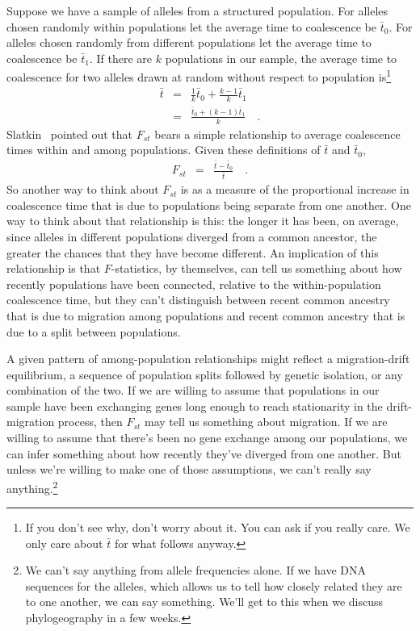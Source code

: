 Suppose we have a sample of alleles from a structured population. For
alleles chosen randomly within populations let the average time to
coalescence be $\bar t_0$. For alleles chosen randomly from different
populations let the average time to coalescence be $\bar t_1$. If
there are $k$ populations in our sample, the average time to
coalescence for two alleles drawn at random without respect to
population is\footnote{If you don't see why, don't worry about it. You
can ask if you really care. We only care about $\bar t$ for what
follows anyway.}
\begin{eqnarray*}
  \bar t &=& \frac{1}{k}\bar t_0 + \frac{k-1}{k}\bar t_1 \\
  &=& \frac{\bar t_0 + (k-1)\bar t_1}
              {k} \quad .
\end{eqnarray*}
Slatkin~\cite{Slatkin-1991} pointed out that $F_{st}$ bears a simple
relationship to average coalescence times within and among
populations. Given these definitions of $\bar t$ and $\bar t_0$,
\begin{eqnarray*}
  F_{st} &=& \frac{\bar t - \bar t_0}{\bar t} \quad .
\end{eqnarray*}
So another way to think about $F_{st}$ is as a measure of the
proportional increase in coalescence time that is due to populations
being separate from one another. One way to think about that
relationship is this: the longer it has been, on average, since
alleles in different populations diverged from a common ancestor, the
greater the chances that they have become different. An implication of
this relationship is that $F$-statistics, by themselves, can tell us
something about how recently populations have been connected, relative
to the within-population coalescence time, but they can't distinguish
between recent common ancestry that is due to migration among
populations and recent common ancestry that is due to a split between
populations.

A given pattern of among-population relationships might reflect a
migration-drift equilibrium, a sequence of population splits followed
by genetic isolation, or any combination of the two. If we are willing
to assume that populations in our sample have been exchanging genes
long enough to reach stationarity in the drift-migration process, then
$F_{st}$ may tell us something about migration. If we are willing to
assume that there's been no gene exchange among our populations, we
can infer something about how recently they've diverged from one
another. But unless we're willing to make one of those assumptions, we
can't really say anything.\footnote{We can't say anything from allele
  frequencies alone. If we have DNA sequences for the alleles, which
  allows us to tell how closely related they are to one another, we
  can say something. We'll get to this when we discuss phylogeography
  in a few weeks.}


